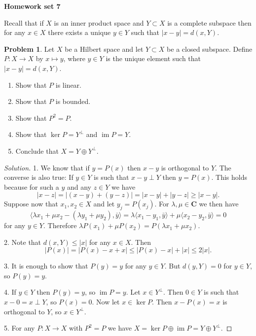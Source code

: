 \documentclass[11pt]{article}
\theoremstyle{definition}
\newtheorem{prob}{Problem}
\newcommand{\kk}[1]{\mathbf{#1}}
\def\<{\langle}
\def\>{\rangle}
\DeclareMathOperator{\im}{im}
\def\head{
\begin{center}
\textbf{\LARGE Homework set 7}
\end{center}
\medskip
}
\begin{document}
\head

Recall that if $X$ is an inner product space and $Y \subset X$ is a complete
subspace then for any $x \in X$ there exists a unique $y \in Y$ such that $|x -
y| = d(x, Y)$.

\begin{prob}
Let $X$ be a Hilbert space and let $Y \subset X$ be a closed subspace.
Define $P : X \to X$ by $x \mapsto y$, where $y \in Y$ is the unique element
such that $|x - y| = d(x, Y)$.
\begin{enumerate}
\item
Show that $P$ is linear.

\item
Show that $P$ is bounded.

\item
Show that $P^2 = P$.

\item
Show that $\ker P = Y^\perp$ and $\im P = Y$.

\item
Conclude that $X = Y \oplus Y^\perp$.
\end{enumerate}
\end{prob}

\begin{proof}[Solution]
1.
We know that if $y = P(x)$ then $x - y$ is orthogonal to $Y$.
The converse is also true: If $y \in Y$ is such that $x - y \perp Y$ then $y =
P(x)$.
This holds because for such a $y$ and any $z \in Y$ we have
\[
|x - z|
= |(x - y) + (y - z)|
= |x - y| + |y - z|
\geq |x - y|.
\]
Suppose now that $x_1, x_2 \in X$ and let $y_j = P(x_j)$.
For $\lambda, \mu \in \kk C$ we then have
\[
\< \lambda x_1 + \mu x_2 - (\lambda y_1 + \mu y_2), \bar y \>
= \lambda \< x_1 - y_1, \bar y \>
+ \mu \< x_2 - y_2, \bar y\>
= 0
\]
for any $y \in Y$.
Therefore $\lambda P(x_1) + \mu P(x_2) = P(\lambda x_1 + \mu x_2)$.

2. Note that $d(x, Y) \leq |x|$ for any $x \in X$.
Then
\[
|P(x)|
= |P(x) - x + x|
\leq |P(x) - x| + |x|
\leq 2|x|.
\]

3. It is enough to show that $P(y) = y$ for any $y \in Y$.
But $d(y, Y) = 0$ for $y \in Y$, so $P(y) = y$.

4. If $y \in Y$ then $P(y) = y$, so $\im P = y$.
Let $x \in Y^\perp$.
Then $0 \in Y$ is such that $x - 0 = x \perp Y$, so $P(x) = 0$.
Now let $x \in \ker P$.
Then $x - P(x) = x$ is orthogonal to $Y$, so $x \in Y^\perp$.

5. For any $P : X \to X$ with $P^2 = P$ we have $X = \ker P \oplus \im P = Y
\oplus Y^\perp$.
\end{proof}
\end{document}
